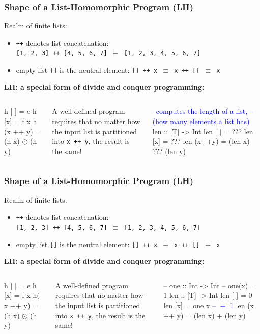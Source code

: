 \documentclass{beamer}
\newcommand{\blue}[1]{\textcolor{Blue}{{#1}}}
\newcommand{\emp}[1]{\textcolor{DikuRed}{ #1}}
\newcommand{\mymath}[1]{$ #1 $}
\begin{document}
\begin{frame}[fragile,t]
\frametitle{Shape of a List-Homomorphic Program (LH)}

Realm of finite lists:
\begin{itemize}
    \item {\tt ++} denotes list concatenation:\\
    {\tt [1, 2, 3] ++ [4, 5, 6, 7] $\equiv$ [1, 2, 3, 4, 5, 6, 7]}
    \item empty list {\tt []} is the neutral element:
        {\tt [] ++ x $\equiv$ x ++ [] $\equiv$ x}
\end{itemize}
\bigskip

\emp{\bf LH: a special form of divide and conquer programming:}
\begin{columns}
\begin{colorcode}[fontsize=\small]
h [ ] = e
h [x] = f x
h (x ++ y) = (h x) \mymath{\odot} (h y)
\end{colorcode}
\pause
\alert{A well-defined program requires that no matter how 
the input list is partitioned into {\tt x ++ y}, the result is the same!}
\begin{colorcode}[fontsize=\small]
\blue{--computes the length of a list,}
\blue{--(how many elements a list has)}
len :: [T] -> Int
len [ ]    = \alert{???}
len [x]    = \alert{???}
len (x++y) = (len x) \alert{???} (len y)
\end{colorcode}
\end{columns}

\end{frame}

\begin{frame}[fragile,t]
\frametitle{Shape of a List-Homomorphic Program (LH)}

Realm of finite lists:
\begin{itemize}
    \item {\tt ++} denotes list concatenation:\\
    {\tt [1, 2, 3] ++ [4, 5, 6, 7] $\equiv$ [1, 2, 3, 4, 5, 6, 7]}
    \item empty list {\tt []} is the neutral element:
        {\tt [] ++ x $\equiv$ x ++ [] $\equiv$ x}
\end{itemize}
\bigskip

\emp{\bf LH: a special form of divide and conquer programming:}
\begin{columns}
\begin{colorcode}[fontsize=\small]
h [ ]   = e
h [x]   = f x
h( x ++ y) = (h x) \mymath{\odot} (h y)
\end{colorcode}
\alert{A well-defined program requires that no matter how 
the input list is partitioned into {\tt x ++ y}, the result is the same!}
\begin{colorcode}[fontsize=\small]
-- one :: Int -> Int
-- one(x) = 1
len :: [T] -> Int
len [ ]    = \emp{0}
len [x]    = \emp{one} x \blue{-- \mymath{\equiv} 1}
len (x ++ y) = (len x) \emp{+} (len y)
\end{colorcode}
\end{columns}

\end{frame}
\end{document}
